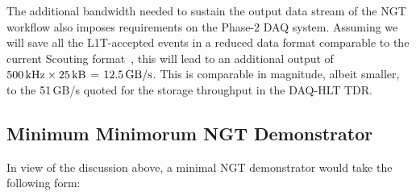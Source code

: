 The additional bandwidth needed to sustain the output data stream of the NGT workflow also imposes requirements on the Phase-2 DAQ system.
Assuming we will save all the L1T-accepted events in a reduced data format comparable to the current Scouting format~\cite{CMS:2024zhe},
this will lead to an additional output of $500\,\text{kHz} 
\times 25\,\text{kB}$ = $12.5\,\text{GB/s}$.
This is comparable in magnitude, albeit smaller, to the 51\,GB/s quoted for the storage throughput in the DAQ-HLT TDR.

\subsection{Minimum Minimorum NGT Demonstrator}

In view of the discussion above, a minimal NGT demonstrator would take the following form:
